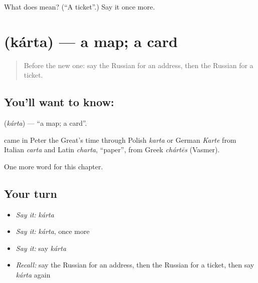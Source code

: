 \begin{tcolorbox}[breakable,colback=teal!4,colframe=teal!35!black,title={Before you move on}]
What does  mean? (\textquotedblleft{}A ticket\textquotedblright{}.) Say it once more.
\end{tcolorbox}
\section[\texorpdfstring{\ru{карта} (kárta)}{карта (kárta)}]{ (kárta) — a map; a card}

\label{lesson:RU-C54-map}



\begin{quote}
Before the new one: say the Russian for an address, then the Russian for a ticket.
\end{quote}

\subsection*{You'll want to know: }
\textbf{} (\emph{kárta}) — \textquotedblleft{}a map; a card\textquotedblright{}.

\begin{cousinweb}
\textbf{} came in Peter the Great's time through Polish \emph{karta} or German \emph{Karte} from Italian \emph{carta} and Latin \emph{charta}, \textquotedblleft{}paper\textquotedblright{}, from Greek \emph{chártēs} (Vasmer).
\end{cousinweb}

\begin{grammarlens}[title={What you've built}]
One more word for this chapter.
\end{grammarlens}

\subsection*{Your turn}
\begin{itemize}
\raggedright
  \item \emph{Say it:} \emph{kárta}
  \item \emph{Say it:} \emph{kárta}, once more
  \item \emph{Say it:} say \emph{kárta}
  \item \emph{Recall:} say the Russian for an address, then the Russian for a ticket, then say \emph{kárta} again
\end{itemize}

